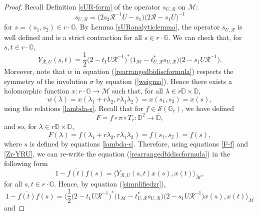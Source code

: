 \documentclass[12pt,reqno]{amsart}
\numberwithin{equation}{section}
\theoremstyle{definition}
\begin{document}
\begin{proof}
Recall Definition \ref{sUR-form} of the operator $s_{U,\mathcal{R}}$  on $\mathcal{M}$:
\begin{equation*}
    s_{U,\mathcal{R}} = \bigg(2s_{2}\mathcal{R}^{-1}U-s_{1}\bigg)\bigg(2\mathcal{R}-s_{1}U\bigg)^{-1} 
\end{equation*}
for $s=(s_{1},s_{2}) \in r \cdot \mathbb{G}$.
By Lemma \ref{sURanalyticlemma}, the operator $s_{U,\mathcal{R}}$ is well defined and is a strict contraction for all $s\in r\cdot\mathbb{G}$. We can check that, for $s,t \in r\cdot \mathbb{G}$,
\begin{equation}\label{simplifiedzr}
Y_{\mathcal{R},U}(s,t) = \dfrac{1}{2}\bigg(2-t_{1}U\mathcal{R}^{-1}\bigg)^{*}\bigg(1_{\mathcal{M}}-t_{U,\mathcal{R}}^{*}s_{U,\mathcal{R}}\bigg)\bigg(2-s_{1}U\mathcal{R}^{-1}\bigg).
\end{equation}
Moreover, note that $w$ in equation (\ref{rearrangedbidiscformula}) respects the symmetry of the involution $\sigma$ by equation (\ref{wsigma}). Hence there exists a holomorphic function $x: r\cdot \mathbb{G}\rightarrow \mathcal{M}$ such that, for all $\lambda\in r\mathbb{D}\times\mathbb{D}$, 
$$ w(\lambda) = x(\lambda_{1}+r\lambda_{2}, r\lambda_{1}\lambda_{2}) = x(s_{1},s_{2})=x(s),$$
using the relations  \eqref{lambda-s}.
Recall that for $f\in\mathcal{S}(\mathbb{G}_{r})$, we have defined 
$$F=f\circ \pi \circ T_{r} : \mathbb{D}^{2} \rightarrow \overline{\mathbb{D}},$$ and so, for   $\lambda \in  r\mathbb{D}\times\mathbb{D}$, 
\begin{equation}\label{F-f}
F(\lambda)= f(\lambda_{1}+r\lambda_{2},r\lambda_{1}\lambda_{2})= f(s_1, s_2)= f(s),
\end{equation}
where $s$ is defined by equations \eqref{lambda-s}.
Therefore, using equations \eqref{F-f} and \eqref{Zr-YRU}, we can re-write the equation (\ref{rearrangedbidiscformula})
in the following form
$$ 1-\overline{f(t)}f(s) = \bigg\langle Y_{\mathcal{R},U}(s,t) x(s), x(t)\bigg\rangle_{\mathcal{M}},$$
for all $s,t\in r\cdot\mathbb{G}$.
Hence, by equation (\ref{simplifiedzr}),
$$1-\overline{f(t)}f(s) = \Bigg\langle \dfrac{1}{2} \bigg(2-t_{1}U\mathcal{R}^{-1}\bigg)^{*}\bigg(1_{\mathcal{M}}-t_{U,\mathcal{R}}^{*}s_{U,\mathcal{R}}\bigg)\bigg(2-s_{1}U\mathcal{R}^{-1}\bigg)x(s),x(t)\Bigg\rangle_{\mathcal{M}}$$
and


\end{proof}
\end{document}
